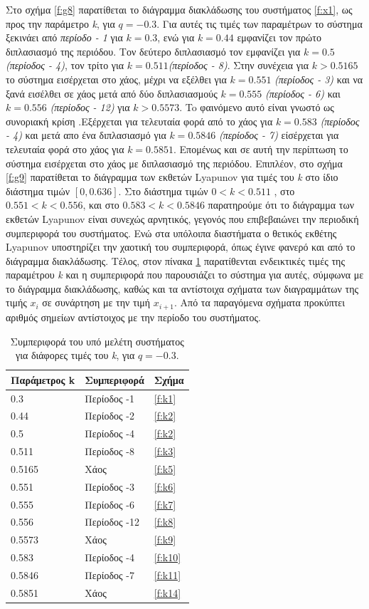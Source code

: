 Στο σχήμα \ref{f:g8} παρατίθεται το διάγραμμα διακλάδωσης του συστήματος \ref{f:x1}, ως προς την παράμετρο \emph{k}, για $q =-0.3$. Για αυτές τις τιμές των παραμέτρων το σύστημα ξεκινάει από \emph{περίοδο - 1} για $k=0.3$, ενώ για  $k = 0.44$ εμφανίζει τον πρώτο διπλασιασμό της περιόδου. Τον δεύτερο διπλασιασμό τον εμφανίζει για $k=0.5$ \emph{(περίοδος -   4)}, τον τρίτο για $k=0.511$\emph{(περίοδος -   8)}. Στην συνέχεια για $k>0.5165$ το σύστημα εισέρχεται στο χάος, μέχρι να εξέλθει  για $k=0.551$ \emph{(περίοδος -   3)} και να ξανά εισέλθει σε χάος μετά από δύο διπλασιασμούς $k=0.555$ \emph{(περίοδος -   6)} και $k=0.556$ \emph{(περίοδος -   12)} για $k>0.5573$. To φαινόμενο αυτό είναι γνωστό ως συνοριακή κρίση .Εξέρχεται για τελευταία φορά από το χάος για $k=0.583$ \emph{(περίοδος -   4)} και μετά απο ένα διπλασιασμό  για $k=0.5846$ \emph{(περίοδος -   7)} είσέρχεται για τελευταία φορά στο χάος για $k=0.5851$.
Επομένως και σε αυτή την περίπτωση το σύστημα εισέρχεται στο χάος με διπλασιασμό της περιόδου. 
Επιπλέον, στο σχήμα \ref{f:g9} παρατίθεται το διάγραμμα των εκθετών Lyapunov για τιμές του \emph{k} στο ίδιο διάστημα τιμών $[0, 0.636]$. Στο διάστημα τιμών   $0<k<0.511$ , στο $0.551<k<0.556$, και στο $0.583<k<0.5846$ παρατηρούμε ότι το διάγραμμα των εκθετών Lyapunov είναι συνεχώς αρνητικός, γεγονός που επιβεβαιώνει την περιοδική συμπεριφορά του συστήματος. Ενώ στα υπόλοιπα διαστήματα ο θετικός εκθέτης Lyapunov υποστηρίζει την χαοτική του συμπεριφορά, όπως έγινε φανερό και από το διάγραμμα διακλάδωσης.
Τέλος, στον πίνακα \ref{tab:abc1} παρατίθενται ενδεικτικές τιμές της παραμέτρου \emph{k} και η συμπεριφορά που παρουσιάζει το σύστημα για αυτές, σύμφωνα με το διάγραμμα διακλάδωσης, καθώς και τα αντίστοιχα σχήματα των διαγραμμάτων της τιμής \(x_i\) σε συνάρτηση με την τιμή \(x_{i+1}\). Από τα παραγόμενα σχήματα προκύπτει αριθμός σημείων αντίστοιχος με την περίοδο του συστήματος.
\begin{table}[h!]
	\centering
	\caption{ Συμπεριφορά του υπό μελέτη συστήματος για διάφορες τιμές του \emph{k}, για $q=-0.3$.}
	\label{tab:abc1}
	\begin{tabular}{l | l | l}
		Παράμετρος k & Συμπεριφορά & Σχήμα\\
		\hline
		0.3 &  Περίοδος -1 & \ref{f:k1}\\
		0.44& Περίοδος -2 & \ref{f:k2}\\
		0.5& Περίοδος -4 & \ref{f:k2}\\
		0.511 &  Περίοδος -8 & \ref{f:k3}\\
		0.5165 & Χάος & \ref{f:k5}\\
		0.551 & Περίοδος -3 & \ref{f:k6}\\
		0.555 & Περίοδος -6 & \ref{f:k7}\\
		0.556 & Περίοδος -12 & \ref{f:k8}\\
		0.5573 & Χάος & \ref{f:k9}\\
		0.583& Περίοδος -4 & \ref{f:k10}\\
		0.5846 & Περίοδος -7 & \ref{f:k11}\\
		0.5851 & Χάος & \ref{f:k14}\\
	\end{tabular}
	
\end{table}

